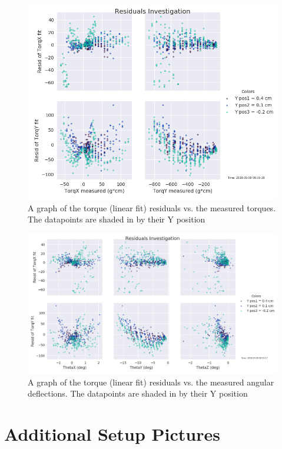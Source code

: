 \documentclass[preprint,12pt,3p]{elsarticle}
\begin{document}
\begin{figure}[H]
\centering
\includegraphics[width=1\textwidth]{images/round1/resids_Torq_coloredY}
\caption{A graph of the torque (linear fit) residuals vs. the measured torques.
The datapoints are shaded in by their Y position}
\end{figure}

\begin{figure}[H]
\centering
\includegraphics[width=1\textwidth]{images/round1/resids_Theta_coloredY.png}
\caption{A graph of the torque (linear fit) residuals vs. the measured angular
    deflections. The datapoints are shaded in by their Y position}
\end{figure}

\newpage

\section{Additional Setup Pictures}
\label{appendix-setup}
\end{document}

